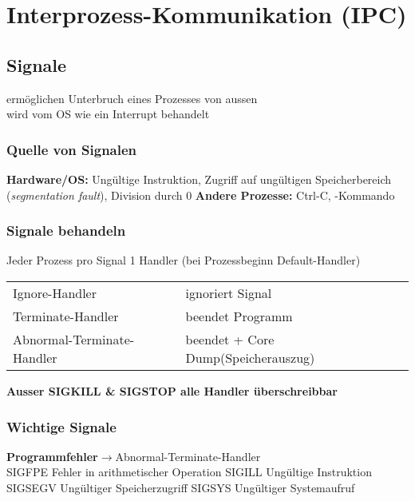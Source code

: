 \section{Interprozess-Kommunikation (IPC)}
\subsection{Signale}
ermöglichen Unterbruch eines Prozesses von aussen\\
wird vom OS wie ein Interrupt behandelt

\subsubsection{Quelle von Signalen}
\textbf{Hardware/OS: }Ungültige Instruktion, Zugriff auf ungültigen Speicherbereich (\textit{segmentation fault}), Division durch 0
\textbf{Andere Prozesse: }Ctrl-C, -Kommando

\subsubsection{Signale behandeln}
Jeder Prozess pro Signal 1 Handler (bei Prozessbeginn Default-Handler)
\begin{tabular}{ll}
     Ignore-Handler & ignoriert Signal \\
     Terminate-Handler &  beendet Programm\\
     Abnormal-Terminate-Handler & beendet + Core Dump(Speicherauszug)
\end{tabular}
\textbf{Ausser SIGKILL \& SIGSTOP alle Handler überschreibbar}

\subsubsection{Wichtige Signale}
\textbf{Programmfehler}$\rightarrow$Abnormal-Terminate-Handler\\
SIGFPE Fehler in arithmetischer Operation SIGILL Ungültige Instruktion SIGSEGV Ungültiger Speicherzugriff SIGSYS Ungültiger Systemaufruf

